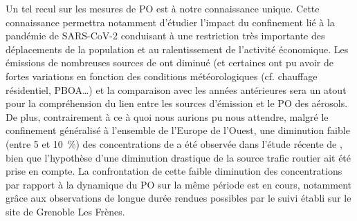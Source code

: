 Un tel recul sur les mesures de PO est à notre connaissance unique. Cette connaissance
permettra notamment d'étudier l'impact du confinement lié à la pandémie de SARS-CoV-2
conduisant à une restriction très importante des déplacements de la population et au
ralentissement de l'activité économique. Les émissions de nombreuses sources de \PMdix{}
ont diminué (et certaines ont pu avoir de fortes variations en fonction des conditions
météorologiques (cf. chauffage résidentiel, PBOA…) et la comparaison avec les années
antérieures sera un atout pour la compréhension du lien entre les sources d'émission et le
PO des aérosols. De plus, contrairement à ce à quoi nous aurions pu nous attendre, malgré
le confinement généralisé à l'ensemble de l'Europe de l'Ouest, une diminution faible
(entre 5 et \SI{10}{\percent}) des concentrations de \PMdc{} a été observée dans l'étude
récente de \cite{menutImpact2020}, bien que l'hypothèse d'une diminution drastique de la
source trafic routier ait été prise en compte.  La confrontation de cette faible diminution
des concentrations \PMdc{} par rapport à la dynamique du PO sur la même période est en
cours, notamment grâce aux observations de longue durée rendues possibles par le suivi
établi sur le site de Grenoble Les Frènes.

